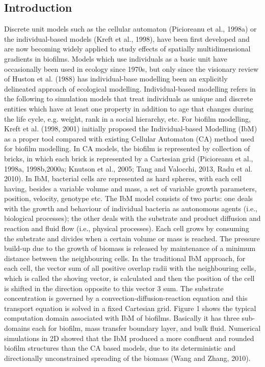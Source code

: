 \documentclass[11pt,a4paper,openright]{article}
\begin{document}
\subsection{Introduction}
Discrete unit models such as the cellular automaton (Picioreanu et al., 1998a) or the individual-based models (Kreft et al., 1998), have been first developed and are now becoming widely applied to study effects of spatially multidimensional gradients in biofilms. Models which use individuals as a basic unit have occasionally been used in ecology since 1970s, but only since the visionary review of Huston et al. (1988) has individual-base modelling been an explicitly delineated approach of ecological modelling. Individual-based modelling refers in the following to simulation models that treat individuals as unique and discrete entities which have at least one property in addition to age that changes during the life cycle, e.g. weight, rank in a social hierarchy, etc. For biofilm modelling, Kreft et al. (1998, 2001) initially proposed the Individual-based Modelling (IbM) as a proper tool compared with existing Cellular Automaton (CA) method used for biofilm modelling. In CA models, the biofilm is represented by collection of bricks, in which each brick is represented by a Cartesian grid (Picioreanu et al., 1998a, 1998b,2000a; Knutson et al., 2005; Tang and Valocchi, 2013, Radu et al. 2010). In IbM, bacterial cells are represented as hard spheres, with each cell having, besides a variable volume and mass, a set of variable growth parameters, position, velocity, genotype etc. The IbM model consists of two parts: one deals with the growth and behaviour of individual bacteria as autonomous agents (i.e., biological processes); the other deals with the substrate and product diffusion and reaction and fluid flow (i.e., physical processes). Each cell grows by consuming the substrate and divides when a certain volume or mass is reached. The pressure build-up due to the growth of biomass is released by maintenance of a minimum distance between the neighbouring cells. In the traditional IbM approach, for each cell, the vector sum of all positive overlap radii with the neighbouring cells, which is called the shoving vector, is calculated and then the position of the cell is shifted in the direction opposite to this vector 3 sum. The substrate concentration is governed by a convection-diffusion-reaction equation and this transport equation is solved in a fixed Cartesian grid. Figure 1 shows the typical computation domain associated with IbM of biofilms. Basically it has three sub-domains each for biofilm, mass transfer boundary layer, and bulk fluid. Numerical simulations in 2D showed that the IbM produced a more confluent and rounded biofilm structures than the CA based models, due to its deterministic and directionally unconstrained spreading of the biomass (Wang and Zhang, 2010).
\end{document}
